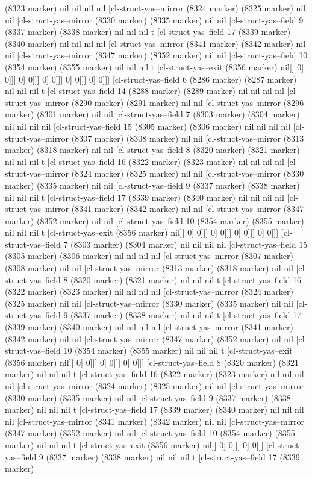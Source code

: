 {{(8323 marker) nil nil nil nil [cl-struct-yas--mirror (8324 marker) (8325 marker) nil nil [cl-struct-yas--mirror (8330 marker) (8335 marker) nil nil [cl-struct-yas--field 9 (8337 marker) (8338 marker) nil nil nil t [cl-struct-yas--field 17 (8339 marker) (8340 marker) nil nil nil nil [cl-struct-yas--mirror (8341 marker) (8342 marker) nil nil [cl-struct-yas--mirror (8347 marker) (8352 marker) nil nil [cl-struct-yas--field 10 (8354 marker) (8355 marker) nil nil nil t [cl-struct-yas--exit (8356 marker) nil]] 0] 0]]] 0] 0]]] 0] 0]]] 0] 0]]] 0] 0]]] [cl-struct-yas--field 6 (8286 marker) (8287 marker) nil nil nil t [cl-struct-yas--field 14 (8288 marker) (8289 marker) nil nil nil nil [cl-struct-yas--mirror (8290 marker) (8291 marker) nil nil [cl-struct-yas--mirror (8296 marker) (8301 marker) nil nil [cl-struct-yas--field 7 (8303 marker) (8304 marker) nil nil nil nil [cl-struct-yas--field 15 (8305 marker) (8306 marker) nil nil nil nil [cl-struct-yas--mirror (8307 marker) (8308 marker) nil nil [cl-struct-yas--mirror (8313 marker) (8318 marker) nil nil [cl-struct-yas--field 8 (8320 marker) (8321 marker) nil nil nil t [cl-struct-yas--field 16 (8322 marker) (8323 marker) nil nil nil nil [cl-struct-yas--mirror (8324 marker) (8325 marker) nil nil [cl-struct-yas--mirror (8330 marker) (8335 marker) nil nil [cl-struct-yas--field 9 (8337 marker) (8338 marker) nil nil nil t [cl-struct-yas--field 17 (8339 marker) (8340 marker) nil nil nil nil [cl-struct-yas--mirror (8341 marker) (8342 marker) nil nil [cl-struct-yas--mirror (8347 marker) (8352 marker) nil nil [cl-struct-yas--field 10 (8354 marker) (8355 marker) nil nil nil t [cl-struct-yas--exit (8356 marker) nil]] 0] 0]]] 0] 0]]] 0] 0]]] 0] 0]]] [cl-struct-yas--field 7 (8303 marker) (8304 marker) nil nil nil nil [cl-struct-yas--field 15 (8305 marker) (8306 marker) nil nil nil nil [cl-struct-yas--mirror (8307 marker) (8308 marker) nil nil [cl-struct-yas--mirror (8313 marker) (8318 marker) nil nil [cl-struct-yas--field 8 (8320 marker) (8321 marker) nil nil nil t [cl-struct-yas--field 16 (8322 marker) (8323 marker) nil nil nil nil [cl-struct-yas--mirror (8324 marker) (8325 marker) nil nil [cl-struct-yas--mirror (8330 marker) (8335 marker) nil nil [cl-struct-yas--field 9 (8337 marker) (8338 marker) nil nil nil t [cl-struct-yas--field 17 (8339 marker) (8340 marker) nil nil nil nil [cl-struct-yas--mirror (8341 marker) (8342 marker) nil nil [cl-struct-yas--mirror (8347 marker) (8352 marker) nil nil [cl-struct-yas--field 10 (8354 marker) (8355 marker) nil nil nil t [cl-struct-yas--exit (8356 marker) nil]] 0] 0]]] 0] 0]]] 0] 0]]] [cl-struct-yas--field 8 (8320 marker) (8321 marker) nil nil nil t [cl-struct-yas--field 16 (8322 marker) (8323 marker) nil nil nil nil [cl-struct-yas--mirror (8324 marker) (8325 marker) nil nil [cl-struct-yas--mirror (8330 marker) (8335 marker) nil nil [cl-struct-yas--field 9 (8337 marker) (8338 marker) nil nil nil t [cl-struct-yas--field 17 (8339 marker) (8340 marker) nil nil nil nil [cl-struct-yas--mirror (8341 marker) (8342 marker) nil nil [cl-struct-yas--mirror (8347 marker) (8352 marker) nil nil [cl-struct-yas--field 10 (8354 marker) (8355 marker) nil nil nil t [cl-struct-yas--exit (8356 marker) nil]] 0] 0]]] 0] 0]]] [cl-struct-yas--field 9 (8337 marker) (8338 marker) nil nil nil t [cl-struct-yas--field 17 (8339 marker) }}
